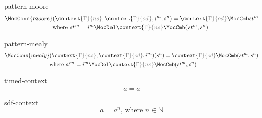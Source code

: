 \documentclass[preview]{standalone}
\begin{document}
\begin{docimage}{pattern-moore}
  \begin{align*}%
    \MocCons{moore} &(\context{\color{gray}\Gamma}{ns},\context{\color{gray}\Gamma}{od},i^m,s^n) = \context{\color{gray}\Gamma}{od} \MocCmb st^m \\
                    &\text{where}\ st^m = i^m \MocDel \context{\color{gray}\Gamma}{ns} \MocCmb (st^m, s^n) 
  \end{align*}
\end{docimage}

\begin{docimage}{pattern-mealy}
  \begin{align*}%
    \MocCons{mealy} &(\context{\color{gray}\Gamma}{ns},\context{\color{gray}\Gamma}{od},i^m)(s^n) = \context{\color{gray}\Gamma}{od} \MocCmb (st^m, s^n) \\
                    &\text{where}\ st^m = i^m \MocDel \context{\color{gray}\Gamma}{ns} \MocCmb (st^m, s^n) 
  \end{align*}
\end{docimage}

\begin{docimage}{timed-context}
  \begin{equation*}%
    \dot{a} = a  
  \end{equation*}
\end{docimage} 

\begin{docimage}{sdf-context}
  \begin{equation*}%
    \dot{a} = a^n \text{, where } n \in \mathbb{N} 
  \end{equation*}
\end{docimage} 
\end{document}
